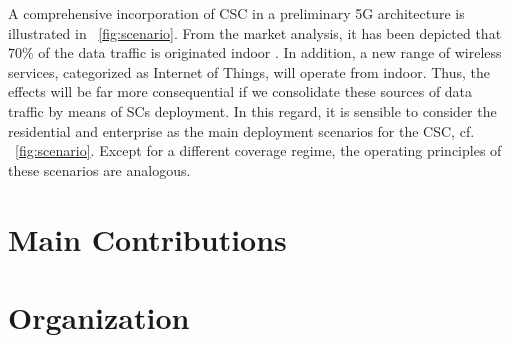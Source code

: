 A comprehensive incorporation of CSC in a preliminary 5G architecture is illustrated in \figurename~\ref{fig:scenario}. From the market analysis, it has been depicted that $70\%$ of the data traffic is originated indoor \cite{Chander08}. In addition, a new range of wireless services, categorized as Internet of Things, will operate from indoor. Thus, the effects will be far more consequential if we consolidate these sources of data traffic by means of SCs deployment. In this regard, it is sensible to consider the residential and enterprise as the main deployment scenarios for the CSC, cf. \figurename~\ref{fig:scenario}. Except for a different coverage regime, the operating principles of these scenarios are analogous.


\section{Main Contributions}

\section{Organization}
